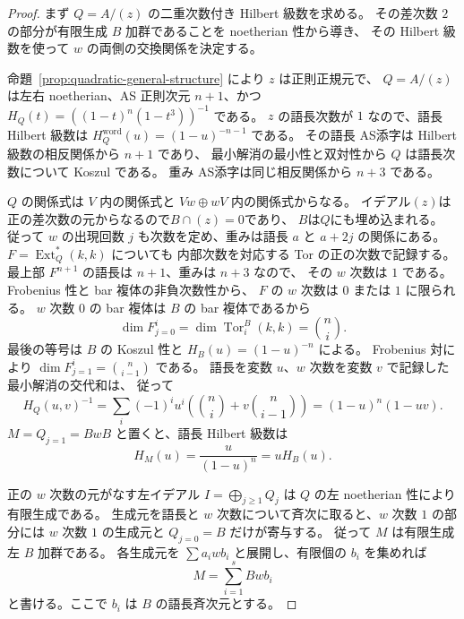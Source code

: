 \documentclass[11pt,a4paper]{ltjsarticle}
\theoremstyle{definition}
\begin{document}
\begin{proof}
まず $Q=A/(z)$ の二重次数付き Hilbert 級数を求める。
その差次数 $2$ の部分が有限生成 $B$ 加群であることを noetherian 性から導き、
その Hilbert 級数を使って $w$ の両側の交換関係を決定する。

命題~\ref{prop:quadratic-general-structure} により $z$ は正則正規元で、
$Q=A/(z)$ は左右 noetherian、AS 正則次元 $n+1$、かつ
$H_Q(t)=((1-t)^n(1-t^3))^{-1}$ である。
$z$ の語長次数が $1$ なので、語長 Hilbert 級数は
$H_Q^{\mathrm{word}}(u)=(1-u)^{-n-1}$ である。
その語長 AS添字は Hilbert 級数の相反関係から $n+1$ であり、
最小解消の最小性と双対性から $Q$ は語長次数について Koszul である。
重み AS添字は同じ相反関係から $n+3$ である。

$Q$ の関係式は $V$ 内の関係式と $Vw\oplus wV$ 内の関係式からなる。
イデアル$(z)$は正の差次数の元からなるので$B\cap(z)=0$であり、
$B$は$Q$にも埋め込まれる。
従って $w$ の出現回数 $j$ も次数を定め、重みは語長 $a$ と
$a+2j$ の関係にある。$F=\operatorname{Ext}_Q^*(k,k)$ についても
内部次数を対応する Tor の正の次数で記録する。
最上部 $F^{n+1}$ の語長は $n+1$、重みは $n+3$ なので、
その $w$ 次数は $1$ である。Frobenius 性と bar 複体の非負次数性から、
$F$ の $w$ 次数は $0$ または $1$ に限られる。
$w$ 次数 $0$ の bar 複体は $B$ の bar 複体であるから
\[
 \dim F^i_{j=0}=\dim\operatorname{Tor}^B_i(k,k)=\binom ni.
\]
最後の等号は $B$ の Koszul 性と $H_B(u)=(1-u)^{-n}$ による。
Frobenius 対により
$\dim F^i_{j=1}=\binom n{i-1}$ である。
語長を変数 $u$、$w$ 次数を変数 $v$ で記録した最小解消の交代和は、
従って
\[
 H_Q(u,v)^{-1}
 =\sum_i(-1)^iu^i\left(\binom ni+v\binom n{i-1}\right)
 =(1-u)^n(1-uv).
\]
$M=Q_{j=1}=BwB$ と置くと、語長 Hilbert 級数は
\begin{equation}\label{eq:one-heavy-component-hilbert}
 H_M(u)=\frac{u}{(1-u)^n}=uH_B(u).
\end{equation}

正の $w$ 次数の元がなす左イデアル
$I=\bigoplus_{j\geq1}Q_{j}$ は $Q$ の左 noetherian 性により有限生成である。
生成元を語長と $w$ 次数について斉次に取ると、$w$ 次数 $1$ の部分には
$w$ 次数 $1$ の生成元と $Q_{j=0}=B$ だけが寄与する。
従って $M$ は有限生成左 $B$ 加群である。
各生成元を $\sum a_iwb_i$ と展開し、有限個の $b_i$ を集めれば
\begin{equation}\label{eq:one-heavy-finite-left-generation}
 M=\sum_{i=1}^s Bwb_i
\end{equation}
と書ける。ここで $b_i$ は $B$ の語長斉次元とする。


\end{proof}
\end{document}
